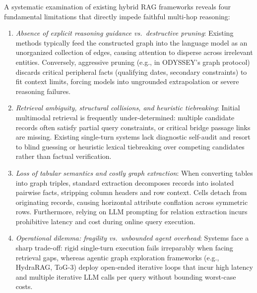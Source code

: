 \documentclass[runningheads]{llncs}
\begin{document}
A systematic examination of existing hybrid RAG frameworks reveals four fundamental limitations that directly impede faithful multi-hop reasoning:
\begin{enumerate}
    \item \emph{Absence of explicit reasoning guidance vs.\ destructive pruning}: Existing methods typically feed the constructed graph into the language model as an unorganized collection of edges, causing attention to disperse across irrelevant entities. Conversely, aggressive pruning (e.g., in ODYSSEY's graph protocol) discards critical peripheral facts (qualifying dates, secondary constraints) to fit context limits, forcing models into ungrounded extrapolation or severe reasoning failures.
    \item \emph{Retrieval ambiguity, structural collisions, and heuristic tiebreaking}: Initial multimodal retrieval is frequently under-determined: multiple candidate records often satisfy partial query constraints, or critical bridge passage links are missing. Existing single-turn systems lack diagnostic self-audit and resort to blind guessing or heuristic lexical tiebreaking over competing candidates rather than factual verification.
    \item \emph{Loss of tabular semantics and costly graph extraction}: When converting tables into graph triples, standard extraction decomposes records into isolated pairwise facts, stripping column headers and row context. Cells detach from originating records, causing horizontal attribute conflation across symmetric rows. Furthermore, relying on LLM prompting for relation extraction incurs prohibitive latency and cost during online query execution.
    \item \emph{Operational dilemma: fragility vs.\ unbounded agent overhead}: Systems face a sharp trade-off: rigid single-turn execution fails irreparably when facing retrieval gaps, whereas agentic graph exploration frameworks (e.g., HydraRAG, ToG-3) deploy open-ended iterative loops that incur high latency and multiple iterative LLM calls per query without bounding worst-case costs.
\end{enumerate}
\end{document}
